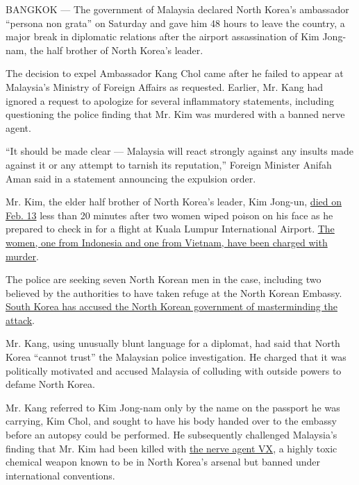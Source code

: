 BANGKOK --- The government of Malaysia declared North Korea's ambassador
``persona non grata'' on Saturday and gave him 48 hours to leave the
country, a major break in diplomatic relations after the airport
assassination of Kim Jong-nam, the half brother of North Korea's leader.

The decision to expel Ambassador Kang Chol came after he failed to
appear at Malaysia's Ministry of Foreign Affairs as requested. Earlier,
Mr. Kang had ignored a request to apologize for several inflammatory
statements, including questioning the police finding that Mr. Kim was
murdered with a banned nerve agent.

``It should be made clear --- Malaysia will react strongly against any
insults made against it or any attempt to tarnish its reputation,''
Foreign Minister Anifah Aman said in a statement announcing the
expulsion order.

Mr. Kim, the elder half brother of North Korea's leader, Kim Jong-un,
\href{https://www.nytimes.com/2017/02/14/world/asia/kim-jong-un-brother-killed-malaysia.html}{died
on Feb. 13} less than 20 minutes after two women wiped poison on his
face as he prepared to check in for a flight at Kuala Lumpur
International Airport.
\href{https://www.nytimes.com/2017/02/28/world/asia/north-korea-kim-jong-nam-death.html}{The
women, one from Indonesia and one from Vietnam, have been charged with
murder}.

The police are seeking seven North Korean men in the case, including two
believed by the authorities to have taken refuge at the North Korean
Embassy.
\href{https://www.nytimes.com/2017/02/20/world/asia/north-korea-assassination-kim-jong-un-brother-malaysia.html}{South
Korea has accused the North Korean government of masterminding the
attack}.

Mr. Kang, using unusually blunt language for a diplomat, had said that
North Korea ``cannot trust'' the Malaysian police investigation. He
charged that it was politically motivated and accused Malaysia of
colluding with outside powers to defame North Korea.

Mr. Kang referred to Kim Jong-nam only by the name on the passport he
was carrying, Kim Chol, and sought to have his body handed over to the
embassy before an autopsy could be performed. He subsequently challenged
Malaysia's finding that Mr. Kim had been killed with
\href{https://www.nytimes.com/2017/02/24/world/asia/vx-nerve-agent-kim-jong-nam.html}{the
nerve agent VX}, a highly toxic chemical weapon known to be in North
Korea's arsenal but banned under international conventions.

